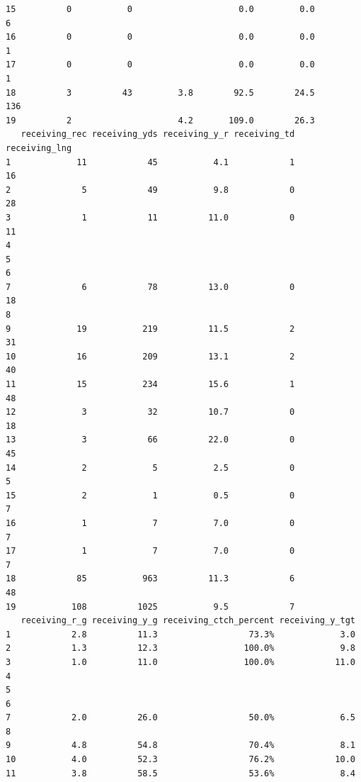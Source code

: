 \documentclass[
]{article}
\begin{document}
\begin{verbatim}
15          0           0                     0.0         0.0             6
16          0           0                     0.0         0.0             1
17          0           0                     0.0         0.0             1
18          3          43         3.8        92.5        24.5           136
19          2                     4.2       109.0        26.3              
   receiving_rec receiving_yds receiving_y_r receiving_td receiving_lng
1             11            45           4.1            1            16
2              5            49           9.8            0            28
3              1            11          11.0            0            11
4                                                                      
5                                                                      
6                                                                      
7              6            78          13.0            0            18
8                                                                      
9             19           219          11.5            2            31
10            16           209          13.1            2            40
11            15           234          15.6            1            48
12             3            32          10.7            0            18
13             3            66          22.0            0            45
14             2             5           2.5            0             5
15             2             1           0.5            0             7
16             1             7           7.0            0             7
17             1             7           7.0            0             7
18            85           963          11.3            6            48
19           108          1025           9.5            7              
   receiving_r_g receiving_y_g receiving_ctch_percent receiving_y_tgt
1            2.8          11.3                  73.3%             3.0
2            1.3          12.3                 100.0%             9.8
3            1.0          11.0                 100.0%            11.0
4                                                                    
5                                                                    
6                                                                    
7            2.0          26.0                  50.0%             6.5
8                                                                    
9            4.8          54.8                  70.4%             8.1
10           4.0          52.3                  76.2%            10.0
11           3.8          58.5                  53.6%             8.4

\end{verbatim}
\end{document}
